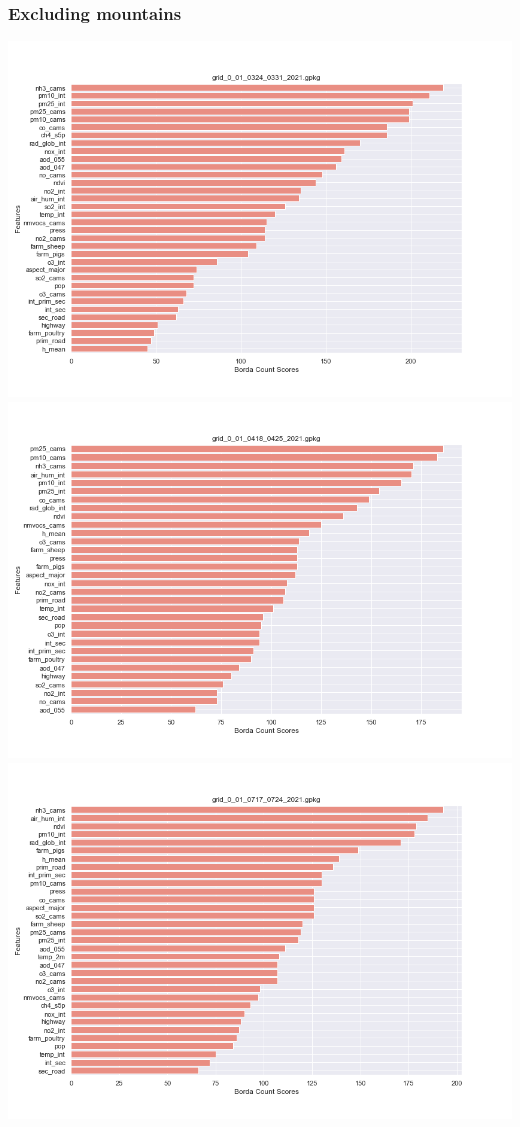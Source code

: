 \subsubsection{Excluding mountains}
\begin{center}
\includegraphics[width=.9\textwidth]{images/fs_results/nh3/001/no_montains/grid_0_01_0324_0331_2021.png}
\includegraphics[width=.9\textwidth]{images/fs_results/nh3/001/no_montains/grid_0_01_0418_0425_2021.png}
\includegraphics[width=.9\textwidth]{images/fs_results/nh3/001/no_montains/grid_0_01_0717_0724_2021.png}

\end{center}
